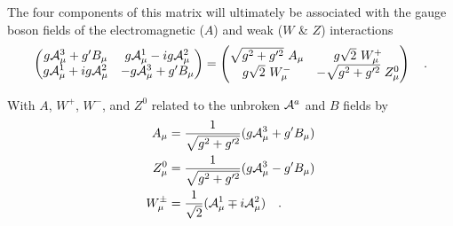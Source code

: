     The four components of this matrix will ultimately be associated with the 
        gauge boson fields of the electromagnetic ($A$) and weak ($W$ \& $Z$) interactions
    \begin{equation} \begin{split}
        \label{eq:electroweak_matrix}
        \begin{pmatrix} 
            g\wField^3_{\mu} + g'B_{\mu} & g\wField^1_{\mu} - ig\wField^2_{\mu} \\
            g\wField^1_{\mu} + ig\wField^2_{\mu} & -g\wField^3_{\mu} + g'B_{\mu}
        \end{pmatrix} =
        \begin{pmatrix} 
            \sqrt{g^2 + g^{\prime 2}}\ A_{\mu} & g \sqrt{2}\ W^+_{\mu} \\
            g \sqrt{2}\ W^-_{\mu} & - \sqrt{g^2 + g^{\prime 2}}\ Z^0_{\mu}
        \end{pmatrix}
        \quad.
    \end{split} \end{equation}

    With $A$, $W^+$, $W^-$, and $Z^0$ related to the unbroken $\mathcal{A}^a$ and $B$ fields by
    \begin{equation} \begin{split}
        A_{\mu} & = \frac{1}{\sqrt{g^2 + g^{\prime 2}}} ( g\mathcal{A}^3_{\mu} + g'B_{\mu} ) \\
        Z^0_{\mu} & = \frac{1}{\sqrt{g^2 + g^{\prime 2}}} ( g\mathcal{A}^3_{\mu} - g'B_{\mu} ) \\
        W^{\pm}_{\mu} & = \frac{1}{\sqrt{2}} (\mathcal{A}^1_{\mu} \mp i\mathcal{A}^2_{\mu})
        \quad.
    \end{split} \end{equation}

